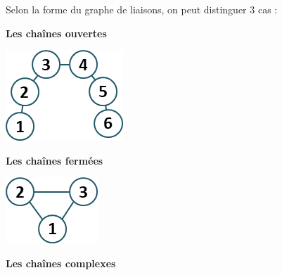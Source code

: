 \begin{defi}
Selon la forme du graphe de liaisons, on peut distinguer 3 cas :
\begin{multicols}{3}
\begin{center}
\textbf{Les chaînes ouvertes} 
\end{center}

\begin{center}


\includegraphics[width=.5\linewidth]{images/ericc_02}
\end{center}


\vfill\null
\columnbreak

\begin{center}
\textbf{Les chaînes fermées} 
\end{center}

\begin{center}


\includegraphics[width=.5\linewidth]{images/sympact_02}
\end{center}

\vfill\null
\columnbreak

\begin{center}
\textbf{Les chaînes complexes} 
\end{center}


\end{multicols}
\end{defi}
